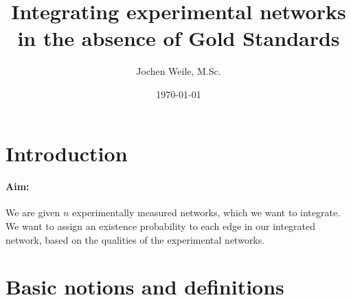 \documentclass{scrartcl}
\title{Integrating experimental networks in the absence of Gold Standards}
\author{Jochen Weile, M.Sc.}
\date{\today}
\newcommand{\prob}{\mathbb{P}}
\newtheorem{theorem}{Theorem}
\newtheorem{definition}{Definition}
\begin{document}
\maketitle

\section{Introduction} 


\paragraph{Aim:} We are given $n$ experimentally measured networks, which we want to integrate. We want to assign an existence probability to each edge in our integrated network, based on the qualities of the experimental networks.

\section{Basic notions and definitions}





\end{document}

